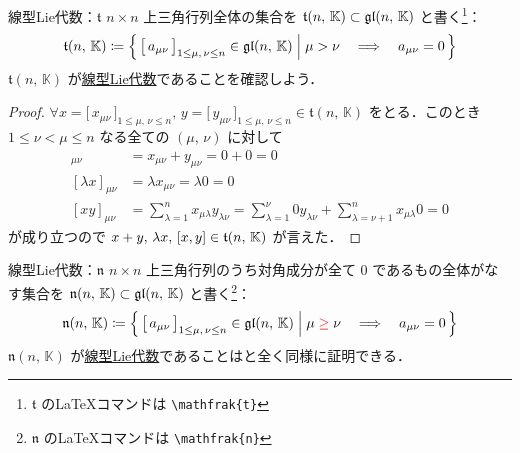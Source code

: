 \documentclass[rep_main]{subfiles}
\begin{document}
\begin{myexample}[label=def:t]{線型Lie代数：$\mathfrak{t}$}
    $n \times n$ 上三角行列全体の集合を $\mathfrak{t}(n,\, \mathbb{K}) \subset \mathfrak{gl}(n,\, \mathbb{K})$ と書く\footnote{$\mathfrak{t}$ の\LaTeX コマンドは \texttt{\textbackslash mathfrak\{t\}}}：
    \begin{align}
        \mathfrak{t}(n,\, \mathbb{K}) \coloneqq \Bigl\{\, \bigl[\, a_{\mu\nu}\, \bigr]_{1 \le \mu,\, \nu \le n} \in \mathfrak{gl}(n,\, \mathbb{K}) \Bigm| \mu > \nu \quad \Longrightarrow \quad a_{\mu\nu} = 0 \,\Bigr\} 
    \end{align}
    $\mathfrak{t}(n,\, \mathbb{K})$ が\hyperref[def:linearLieAlg]{線型Lie代数}であることを確認しよう．
    \begin{proof}
        $\forall x = \bigl[\, x_{\mu\nu}\, \bigr]_{1\le \mu,\, \nu \le n},\, y = \bigl[\, y_{\mu\nu}\, \bigr]_{1\le \mu,\, \nu \le n} \in \mathfrak{t}(n,\, \mathbb{K})$ をとる．このとき $1 \le \nu < \mu \le n$ なる全ての $(\mu,\, \nu)$ に対して
        \begin{align}
            [x + y]_{\mu\nu} &= x_{\mu\nu} + y_{\mu\nu} = 0 + 0 = 0 \\
            [\lambda x]_{\mu\nu} &= \lambda x_{\mu\nu} = \lambda 0 = 0 \\
            [xy]_{\mu\nu}
            &= \sum_{\lambda=1}^n x_{\mu \lambda} y_{\lambda \nu}
            = \sum_{\lambda=1}^{\nu} 0 y_{\lambda\nu} + \sum_{\lambda=\nu+1}^n x_{\mu\lambda} 0
            = 0
        \end{align}
        が成り立つので $x + y,\, \lambda x,\, \comm{x}{y} \in \mathfrak{t}(n,\, \mathbb{K})$ が言えた．
    \end{proof}
\end{myexample}


\begin{myexample}[label=def:n]{線型Lie代数：$\mathfrak{n}$}
    $n \times n$ 上三角行列のうち対角成分が全て $0$ であるもの全体がなす集合を $\mathfrak{n}(n,\, \mathbb{K}) \subset \mathfrak{gl}(n,\, \mathbb{K})$ と書く\footnote{$\mathfrak{n}$ の\LaTeX コマンドは \texttt{\textbackslash mathfrak\{n\}}}：
    \begin{align}
        \mathfrak{n}(n,\, \mathbb{K}) \coloneqq \Bigl\{\, \bigl[\, a_{\mu\nu}\, \bigr]_{1 \le \mu,\, \nu \le n} \in \mathfrak{gl}(n,\, \mathbb{K}) \Bigm| \mu \;\textcolor{red}{\ge}\; \nu \quad \Longrightarrow \quad a_{\mu\nu} = 0 \,\Bigr\} 
    \end{align}
    $\mathfrak{n}(n,\, \mathbb{K})$ が\hyperref[def:linearLieAlg]{線型Lie代数}であることはと全く同様に証明できる．
\end{myexample}
\end{document}
